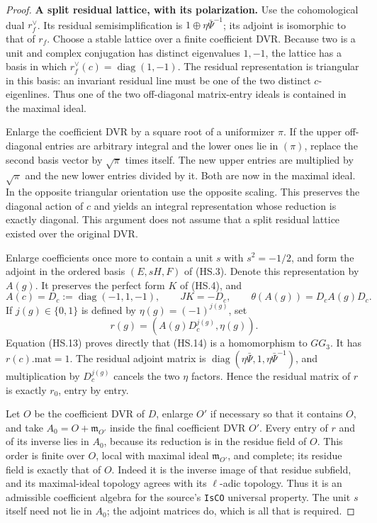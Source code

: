 \documentclass[11pt,a4paper]{article}
\theoremstyle{definition}
\renewcommand{\paragraph}[1]{\par\smallskip\noindent\textbf{#1}\quad\ignorespaces}
\begin{document}
\begin{proof}
\paragraph{A split residual lattice, with its polarization.}
Use the cohomological dual $r_f^\vee$.  Its residual
semisimplification is $1\oplus\eta\bar\Psi^{-1}$; its
adjoint is isomorphic to that of $r_f$.  Choose a stable
lattice over a finite coefficient DVR.  Because two is a
unit and complex conjugation has distinct eigenvalues
$1,-1$, the lattice has a basis in which
$r_f^\vee(c)=\operatorname{diag}(1,-1)$.  The residual
representation is triangular in this basis: an invariant
residual line must be one of the two distinct $c$-eigenlines.
Thus one of the two off-diagonal matrix-entry ideals is
contained in the maximal ideal.

Enlarge the coefficient DVR by a square root of a uniformizer
$\pi$.  If the upper off-diagonal entries are arbitrary
integral and the lower ones lie in $(\pi)$, replace the
second basis vector by $\sqrt\pi$ times itself.  The new
upper entries are multiplied by $\sqrt\pi$ and the new
lower entries divided by it.  Both are now in the maximal
ideal.  In the opposite triangular orientation use the
opposite scaling.  This preserves the diagonal action of
$c$ and yields an integral representation whose reduction
is exactly diagonal.  This argument does not assume that
a split residual lattice existed over the original DVR.

Enlarge coefficients once more to contain a unit $s$ with
$s^2=-1/2$, and form the adjoint in the ordered basis
$(E,sH,F)$ of (HS.3).  Denote this representation by $A(g)$.
It preserves the perfect form $K$ of (HS.4), and
\[
 A(c)=D_c:=\operatorname{diag}(-1,1,-1),\qquad
 JK=-D_c,\qquad\theta(A(g))=D_cA(g)D_c.                    \tag{HS.13}
\]
If $j(g)\in\{0,1\}$ is defined by
$\eta(g)=(-1)^{j(g)}$, set
\[
                 r(g)=(A(g)D_c^{j(g)},\eta(g)).              \tag{HS.14}
\]
Equation (HS.13) proves directly that (HS.14) is a
homomorphism to $GG_3$.  It has $r(c).\mathrm{mat}=1$.
The residual adjoint matrix is
$\operatorname{diag}(\eta\bar\Psi,1,
\eta\bar\Psi^{-1})$, and multiplication by $D_c^{j(g)}$
cancels the two $\eta$ factors.  Hence the residual matrix
of $r$ is exactly $r_0$, entry by entry.

Let $O$ be the coefficient DVR of $D$, enlarge $O'$ if necessary
so that it contains $O$, and take
$A_0=O+\mathfrak m_{O'}$ inside the final coefficient DVR $O'$.
Every entry of $r$ and of its inverse lies in $A_0$, because
its reduction is in the residue field of $O$.
This order is finite over $O$, local with maximal ideal
$\mathfrak m_{O'}$, and complete; its residue field is exactly
that of $O$.  Indeed it is the inverse image of that residue
subfield, and its maximal-ideal topology agrees with its
$\ell$-adic topology.  Thus it is an admissible coefficient
algebra for the source's \texttt{IsCO} universal property.
The unit $s$ itself need not lie in $A_0$; the adjoint
matrices do, which is all that is required.


\end{proof}
\end{document}
